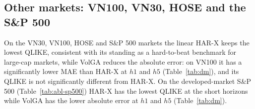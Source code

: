 \documentclass[runningheads]{llncs}
\begin{document}
\begin{table}[t]
\centering
\caption{Graph ablation on HNX: the no-graph LSTM vs the full VolGA (HAR-X for reference). MSE $\times10^{-7}$,
RMSE/MAE $\times10^{-4}$.}
\label{tab:abl-graph}
\footnotesize
\setlength{\tabcolsep}{5pt}

\end{table}

\subsection{Other markets: VN100, VN30, HOSE and the S\&P 500}
On the VN30, VN100, HOSE and S\&P 500 markets the linear HAR-X keeps the lowest QLIKE, consistent with its standing as a
hard-to-beat benchmark for large-cap markets, while VolGA reduces the absolute error: on VN100 it has a
significantly lower MAE than HAR-X at $h1$ and $h5$ (Table~\ref{tab:dm}), and its QLIKE is not significantly
different from HAR-X. On the developed-market S\&P 500 (Table~\ref{tab:abl-sp500}) HAR-X has the lowest QLIKE at
the short horizons while VolGA has the lower absolute error at $h1$ and $h5$ (Table~\ref{tab:dm}).

\begin{table}[t]
\centering
\caption{Market ablation --- VN100 (46{,}308 masked obs over 454 test dates at $h1$; learned: seed mean, QLIKE
$\pm$~std). Lower is better. MSE $\times10^{-7}$, RMSE/MAE $\times10^{-4}$.}
\label{tab:abl-vn100}
\footnotesize
\setlength{\tabcolsep}{5pt}

\end{table}

\begin{table}[t]
\centering
\caption{Market ablation --- VN30 (10{,}106 masked obs over 326 test dates at $h1$). Same scaling as
Table~\ref{tab:abl-vn100}.}
\label{tab:abl-vn30}
\footnotesize
\setlength{\tabcolsep}{5pt}

\end{table}

\begin{table}[t]
\centering
\caption{Market ablation --- HOSE (352 tickers). Same scaling as Table~\ref{tab:abl-vn100}.}
\label{tab:abl-hose}
\footnotesize
\setlength{\tabcolsep}{5pt}

\end{table}
\end{document}
